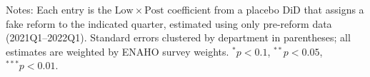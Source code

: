 \begin{table}[!tbp]\centering
\caption{In-time placebo reforms (pre-reform window only)}\label{tab:placebo}
\begin{threeparttable}

\begin{tablenotes}\footnotesize
\item Notes: Each entry is the $\mathrm{Low}\times\mathrm{Post}$ coefficient from a placebo DiD that assigns a fake reform to the indicated quarter, estimated using only pre-reform data (2021Q1--2022Q1). Standard errors clustered by department in parentheses; all estimates are weighted by ENAHO survey weights. $^{*}p<0.1$, $^{**}p<0.05$, $^{***}p<0.01$.
\end{tablenotes}
\end{threeparttable}
\end{table}
